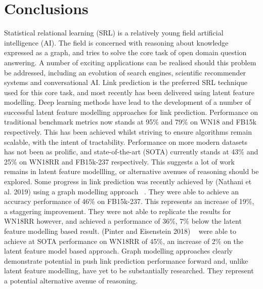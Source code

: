 
\chapter{Conclusions}  %

\ifpdf
    \graphicspath{{Chapter5/Figs/Raster/}{Chapter5/Figs/PDF/}{Chapter5/Figs/}}
\else
    \graphicspath{{Chapter5/Figs/Vector/}{Chapter5/Figs/}}
\fi



Statistical relational learning (SRL) is a relatively young field artificial intelligence (AI). The field is concerned with reasoning about knowledge expressed as a graph, and tries to solve the core task of open domain question answering. A number of exciting applications can be realised should this problem be addressed, including an evolution of search engines, scientific recommender systems and conversational AI. Link prediction is the preferred SRL technique used for this core task, and most recently has been delivered using latent feature modelling. \newline
Deep learning methods have lead to the development of a number of successful latent feature modelling approaches for link prediction. Performance on traditional benchmark metrics now stands at 95\% and 79\% on WN18 and FB15k respectively. This has been achieved whilst striving to ensure algorithms remain scalable, with the intent of tractability. Performance on more modern datasets has not been as prolific, and state-of-the-art (SOTA) currently stands at 43\% and 25\% on WN18RR and FB15k-237 respectively. This suggests a lot of work remains in latent feature modellling, or alternative avenues of reasoning should be explored. \newline
Some progress in link prediction was recently achieved by (Nathani et al. 2019) using a graph modelling approach ~\citep{nathani2019learning}. They were able to achieve an accuracy performance of 46\% on FB15k-237. This represents an increase of 19\%, a staggering improvement. They were not able to replicate the results for WN18RR however, and achieved a performance of 36\%, 7\% below the latent feature modelling based result. (Pinter and Eisenstein 2018) ~\citep{pinter-eisenstein-2018-predicting} were able to achieve at SOTA performance on WN18RR of 45\%, an increase of 2\% on the latent feature model based approach. Graph modelling approaches clearly demonstrate potential in push link prediction performance forward and, unlike latent feature modelling, have yet to be substantially researched. They represent a potential alternative avenue of reasoning. \newpage

